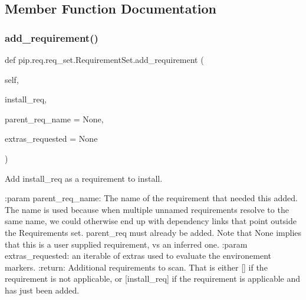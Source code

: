 \subsection{Member Function Documentation}
\mbox{\label{classpip_1_1req_1_1req__set_1_1_requirement_set_a8cacf654f61cd826c8b90b9ff94e7de8}} 
\subsubsection{\texorpdfstring{add\+\_\+requirement()}{add\_requirement()}}
{\footnotesize\ttfamily def pip.\+req.\+req\+\_\+set.\+Requirement\+Set.\+add\+\_\+requirement (\begin{DoxyParamCaption}\item[{}]{self,  }\item[{}]{install\+\_\+req,  }\item[{}]{parent\+\_\+req\+\_\+name = {\ttfamily None},  }\item[{}]{extras\+\_\+requested = {\ttfamily None} }\end{DoxyParamCaption})}

\begin{DoxyVerb}Add install_req as a requirement to install.

:param parent_req_name: The name of the requirement that needed this
    added. The name is used because when multiple unnamed requirements
    resolve to the same name, we could otherwise end up with dependency
    links that point outside the Requirements set. parent_req must
    already be added. Note that None implies that this is a user
    supplied requirement, vs an inferred one.
:param extras_requested: an iterable of extras used to evaluate the
    environement markers.
:return: Additional requirements to scan. That is either [] if
    the requirement is not applicable, or [install_req] if the
    requirement is applicable and has just been added.
\end{DoxyVerb}
 \mbox{\label{classpip_1_1req_1_1req__set_1_1_requirement_set_ad5c331a8b97315aa831ed8b6f781119b}} 
